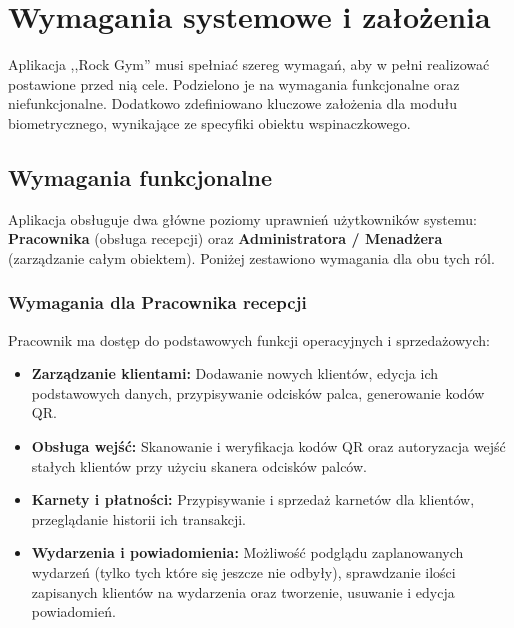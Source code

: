 \chapter{Wymagania systemowe i założenia}
\label{cha:wymagania}

Aplikacja ,,Rock Gym'' musi spełniać szereg wymagań, aby w pełni realizować postawione przed nią cele. Podzielono je na wymagania funkcjonalne oraz niefunkcjonalne. Dodatkowo zdefiniowano kluczowe założenia dla modułu biometrycznego, wynikające ze specyfiki obiektu wspinaczkowego.

\section{Wymagania funkcjonalne}
\label{sec:wymaganiaFunkcjonalne}

Aplikacja obsługuje dwa główne poziomy uprawnień użytkowników systemu: \textbf{Pracownika} (obsługa recepcji) oraz \textbf{Administratora / Menadżera} (zarządzanie całym obiektem). Poniżej zestawiono wymagania dla obu tych ról.

\subsection{Wymagania dla Pracownika recepcji}
Pracownik ma dostęp do podstawowych funkcji operacyjnych i sprzedażowych:
\begin{itemize}
    \item \textbf{Zarządzanie klientami:} Dodawanie nowych klientów, edycja ich podstawowych danych, przypisywanie odcisków palca, generowanie kodów QR.
    \item \textbf{Obsługa wejść:} Skanowanie i weryfikacja kodów QR oraz autoryzacja wejść stałych klientów przy użyciu skanera odcisków palców.
    \item \textbf{Karnety i płatności:} Przypisywanie i sprzedaż karnetów dla klientów, przeglądanie historii ich transakcji.
    \item \textbf{Wydarzenia i powiadomienia:} Możliwość podglądu zaplanowanych wydarzeń (tylko tych które się jeszcze nie odbyły), sprawdzanie ilości zapisanych klientów na wydarzenia oraz tworzenie, usuwanie i edycja powiadomień.
\end{itemize}

